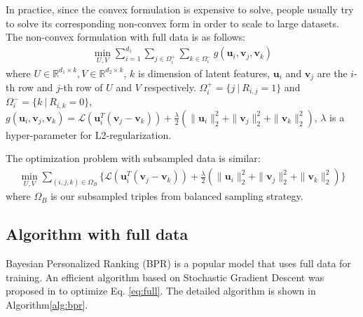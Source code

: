 \documentclass{article}
\numberwithin{equation}{section}
\newcommand{\R}{\mathbb{R}}
\newtheorem{sampling strategy}{Sampling Strategy}
\begin{document}
In practice, since the convex formulation is expensive to solve, people usually try to solve its corresponding non-convex form in order to scale to  large datasets. The non-convex formulation with full data is as follows: 
\begin{equation}
    \begin{aligned}
        \underset{U,V}{\min} \sum_{i=1}^{d_1} \underset{j \in \Omega_i^+}{\sum} \underset{k \in \Omega_i^-}{\sum} g(\bm{u}_i,\bm{v}_j,\bm{v}_k)
        \label{eq:full}
    \end{aligned}
\end{equation}
where $U \in \R^{d_1 \times k}, V \in \R^{d_2 \times k}$, $k$ is dimension of latent features, $\bm{u}_i$ and $\bm{v}_j$ are the $i$-th row and $j$-th row of $U$ and $V$ respectively. $\Omega_i^+ = \{j ~|~ R_{i,j} = 1\}$ and $\Omega_i^- = \{k ~|~ R_{i,k} = 0\}$, $\displaystyle g(\bm{u}_i,\bm{v}_j,\bm{v}_k) = \mathcal{L}( \bm{u}_i^T(\bm{v}_j - \bm{v}_k) ) + \frac{\lambda}{2} (\|\bm{u}_i\|_2^2 + \|\bm{v}_j\|_2^2 + \|\bm{v}_k\|_2^2 )$, $\lambda$ is a hyper-parameter for L2-regularization.

The optimization problem with subsampled data is similar:
\begin{equation}
    \begin{aligned}
        \underset{U,V}{\min} \underset{(i,j,k) \in \Omega_B}{\sum}  \big\{ \mathcal{L}( \bm{u}_i^T(\bm{v}_j - \bm{v}_k) ) + \frac{\lambda}{2} (\|\bm{u}_i\|_2^2 + \|\bm{v}_j\|_2^2 + \|\bm{v}_k\|_2^2 ) \big\}
        \label{eq:sub}
    \end{aligned}
\end{equation}
where $\Omega_B$ is our subsampled triples from balanced sampling strategy.


\subsection{Algorithm with full data}

Bayesian Personalized Ranking (BPR) is a popular model that uses  full data for training. An efficient algorithm based on Stochastic Gradient Descent was proposed in \cite{bpr} to optimize Eq.  \ref{eq:full}. The detailed algorithm is shown in Algorithm\ref{alg:bpr}.
\end{document}
